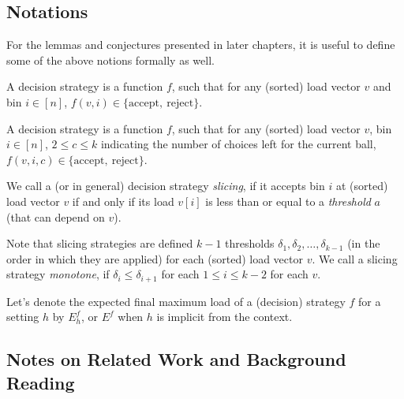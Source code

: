 \subsection{Notations}

For the lemmas and conjectures presented in later chapters, it is useful to define some of the above notions formally as well.

\begin{definition} 
A \TwoThinning decision strategy is a function $f$, such that for any (sorted) load vector $v$ and bin $i\in[n]$, $f(v, i)\in\{\mathrm{accept},\ \mathrm{reject}\}$.
\end{definition}


\begin{definition} 
A \KThinning decision strategy is a function $f$, such that for any (sorted) load vector $v$, bin $i\in[n]$, $2\leq c \leq k$ indicating the number of choices left for the current ball, $f(v, i, c)\in\{\mathrm{accept},\ \mathrm{reject}\}$.
\end{definition}


\begin{definition} 
We call a \TwoThinning (or \KThinning in general) decision strategy \textit{slicing}, if it accepts bin $i$ at (sorted) load vector $v$ if and only if its load $v[i]$ is less than or equal to a \textit{threshold} $a$ (that can depend on $v$).
\end{definition}


\begin{definition} 
Note that \KThinning slicing strategies are defined $k-1$ thresholds $\delta_1,\delta_2,\ldots,\delta_{k-1}$ (in the order in which they are applied) for each (sorted) load vector $v$. We call a \KThinning slicing strategy \textit{monotone}, if $\delta_i\leq \delta_{i+1}$ for each $1\leq i\leq k-2$ for each $v$.
\end{definition}


\begin{definition} 
Let's denote the expected final maximum load of a (decision) strategy $f$ for a setting $h$ by $E^f_h$, or $E^f$ when $h$ is implicit from the context.
\end{definition}



\subsection{Notes on Related Work and Background Reading}

